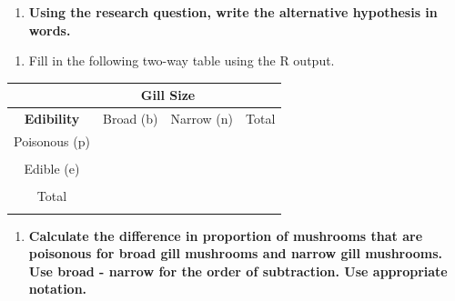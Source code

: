 \documentclass[
]{report}
\providecommand{\tightlist}{%
  \setlength{\itemsep}{0pt}\setlength{\parskip}{0pt}}
\begin{document}
\vspace{0.25in}

\newpage

\begin{enumerate}
\def\labelenumi{\arabic{enumi}.}
\setcounter{enumi}{4}
\tightlist
\item
  \textbf{Using the research question, write the alternative hypothesis in words.}
\end{enumerate}

\vspace{1in}

\begin{enumerate}
\def\labelenumi{\arabic{enumi}.}
\setcounter{enumi}{5}
\tightlist
\item
  Fill in the following two-way table using the R output.
\end{enumerate}

\begin{center}
\begin{tabular}{|c|c|c|c|}\hline
& \multicolumn{2}{|c|}{\textbf{Gill Size}} & \\ \hline
\textbf{Edibility} & \hspace{0.35in} Broad (b) \hspace{0.35in} & \hspace{0.35in} Narrow (n) \hspace{0.35in} & \hspace{0.35in} Total \hspace{0.35in} \\ \hline
 Poisonous (p) & & & \\ 
 & & & \\ \hline
Edible (e) & & & \\ 
 & & & \\ \hline
 Total & & & \\ 
 & & & \\ \hline
\end{tabular}
\end{center}

\begin{enumerate}
\def\labelenumi{\arabic{enumi}.}
\setcounter{enumi}{6}
\tightlist
\item
  \textbf{Calculate the difference in proportion of mushrooms that are poisonous for broad gill mushrooms and narrow gill mushrooms. Use broad - narrow for the order of subtraction. Use appropriate notation.}
\end{enumerate}

\vspace{0.8in}
\end{document}
